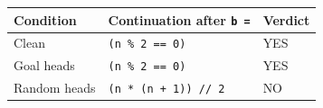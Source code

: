 \begin{tabular}{lp{.48\linewidth}l}\toprule
Condition & Continuation after \texttt{b =} & Verdict\\\midrule
Clean & \texttt{(n \% 2 == 0)} & YES\\
Goal heads & \texttt{(n \% 2 == 0)} & YES\\
Random heads & \texttt{(n * (n + 1)) // 2} & NO\\
\bottomrule\end{tabular}